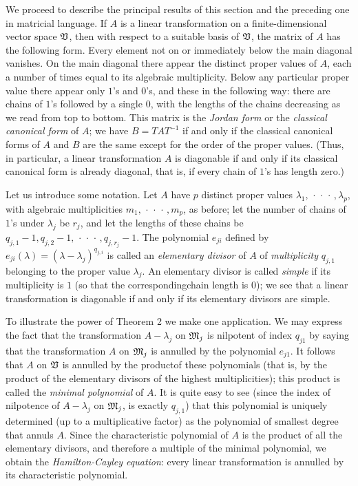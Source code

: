 We proceed to describe the principal results of this section and the preceding
one in matricial language. If \(A\) is a linear transformation on a
finite-dimensional vector space \(\mathfrak{V}\), then with respect to a suitable
basis of \(\mathfrak{V}\), the matrix of \(A\) has the following form. Every element
not on or immediately below the main diagonal vanishes. On the main diagonal
there appear the distinct proper values of \(A\), each a number of times equal
to its algebraic multiplicity. Below any particular proper value there appear
only \(1\)'s and \(0\)'s, and these in the following way: there are chains of
\(1\)'s followed by a single \(0\), with the lengths of the chains decreasing as
we read from top to bottom. This matrix is the \emph{Jordan form} or the
\emph{classical canonical form} of \(A\); we have \(B = TAT^{-1}\) if and only
if the classical canonical forms of \(A\) and \(B\) are the same except for the
order of the proper values. (Thus, in particular, a linear transformation \(A\)
is diagonable if and only if its classical canonical form is already diagonal,
that is, if every chain of \(1\)'s has length zero.)

Let us introduce some notation. Let \(A\) have \(p\) distinct proper values
\(\lambda_1, \,\cdot\,\cdot\,\cdot\,, \lambda_p\), with algebraic multiplicities
\(m_1, \,\cdot\,\cdot\,\cdot\,, m_p\), as before; let the number of chains of
\(1\)'s under \(\lambda_j\) be \(r_j\), and let the lengths of these chains be
\(q_{j,1} - 1, q_{j,2} -1, \,\cdot\,\cdot\,\cdot\,, q_{j, r_j} -1\). The
polynomial \(e_{ji}\) defined by \(e_{ji}(\lambda) = (\lambda -
\lambda_j)^{q_{j,i}}\) is called an \emph{elementary divisor} of \(A\) of
\emph{multiplicity} \(q_{j, 1}\) belonging to the proper value \(\lambda_j\). An
elementary divisor is called \emph{simple} if its multiplicity is \(1\) (so that
the correspondingchain length is \(0\)); we see that a linear transformation is
diagonable if and only if its elementary divisors are simple.

To illustrate the power of Theorem 2 we make one application. We may express the
fact that the transformation \(A - \lambda_j\) on \(\mathfrak{M}_j\) is nilpotent of
index \(q_{j1}\) by saying that the transformation \(A\) on \(\mathfrak{M}_j\) is
annulled by the polynomial \(e_{j1}\). It follows that \(A\) on \(\mathfrak{V}\) is
annulled by the productof these polynomials (that is, by the product of the
elementary divisors of the highest multiplicities); this product is called the
\emph{minimal polynomial} of \(A\). It is quite easy to see (since the index of
nilpotence of \(A - \lambda_j\) on \(\mathfrak{M}_j\), is exactly \(q_{j,1}\)) that
this polynomial is uniquely determined (up to a multiplicative factor) as the
polynomial of smallest degree that annuls \(A\). Since the characteristic
polynomial of \(A\) is the product of all the elementary divisors, and therefore
a multiple of the minimal polynomial, we obtain the \emph{Hamilton-Cayley
equation}: every linear transformation is annulled by its characteristic
polynomial.


